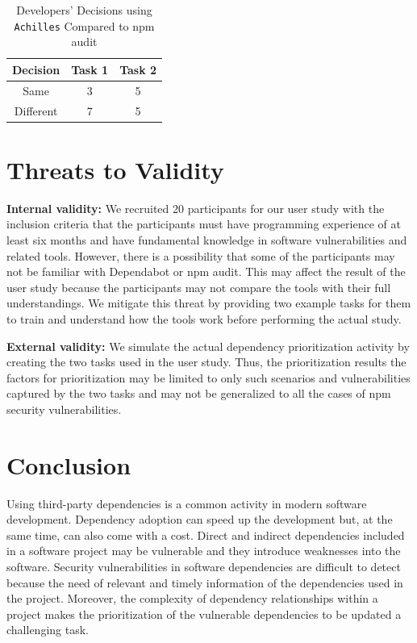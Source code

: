 \documentclass[conference]{IEEEtran}
\begin{document}
	\begin{table}[tb]
		\centering
		\caption{Developers' Decisions using \texttt{Achilles} Compared to npm audit}
		\begin{tabular}{ccc} 
			\toprule
			Decision & Task 1 & Task 2 \\
			\midrule
			Same & 3 & 5\\ 
			Different & 7 & 5 \\
			\bottomrule
		\end{tabular}
		\label{table:x3}
	\end{table}
	
	\section{Threats to Validity}
	\textbf{Internal validity:} We recruited 20 participants for our user study with the inclusion criteria that the participants must have programming experience of at least six months and have fundamental knowledge in software vulnerabilities and related tools. However, there is a possibility that some of the participants may not be familiar with Dependabot or npm audit. This may affect the result of the user study because the participants may not compare the tools with their full understandings. We mitigate this threat by providing two example tasks for them to train and understand how the tools work before performing the actual study. 
	
	\textbf{External validity:} We simulate the actual dependency prioritization activity by creating the two tasks used in the user study. Thus, the prioritization results the factors for prioritization may be limited to only such scenarios and vulnerabilities captured by the two tasks and may not be generalized to all the cases of npm security vulnerabilities.
	
	\section{Conclusion}
	Using third-party dependencies is a common activity in modern software development. Dependency adoption can speed up the development but, at the same time, can also come with a cost. Direct and indirect dependencies included in a software project may be vulnerable and they introduce weaknesses into the software. Security vulnerabilities in software dependencies are difficult to detect because the need of relevant and timely information of the dependencies used in the project. Moreover, the complexity of dependency relationships within a project makes the prioritization of the vulnerable dependencies to be updated a challenging task. 
	
\end{document}
